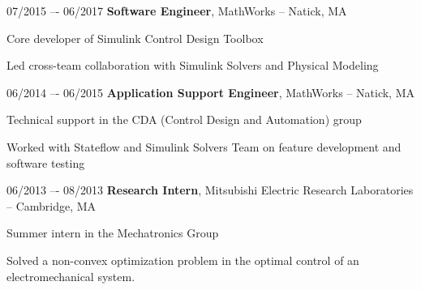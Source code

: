 \begin{twocolentry}{07/2015 –- 06/2017}
\textbf{Software Engineer}, MathWorks -- Natick, MA\end{twocolentry}
\vspace{0.10 cm}
\begin{onecolentry}
\begin{highlights}
\item Core developer of Simulink Control Design Toolbox
\item Led cross-team collaboration with Simulink Solvers and Physical Modeling
\end{highlights}
\end{onecolentry}
\vspace{0.25 cm}

\begin{twocolentry}{06/2014 –- 06/2015}
\textbf{Application Support Engineer}, MathWorks -- Natick, MA\end{twocolentry}
\vspace{0.10 cm}
\begin{onecolentry}
\begin{highlights}
\item Technical support in the CDA (Control Design and Automation) group
\item Worked with Stateflow and Simulink Solvers Team on feature development and software testing
\end{highlights}
\end{onecolentry}
\vspace{0.25 cm}

\begin{twocolentry}{06/2013 –- 08/2013}
\textbf{Research Intern}, Mitsubishi Electric Research Laboratories -- Cambridge, MA\end{twocolentry}
\vspace{0.10 cm}
\begin{onecolentry}
\begin{highlights}
\item Summer intern in the Mechatronics Group
\item Solved a non-convex optimization problem in the optimal control of an electromechanical system.
\end{highlights}
\end{onecolentry}
\vspace{0.25 cm}

